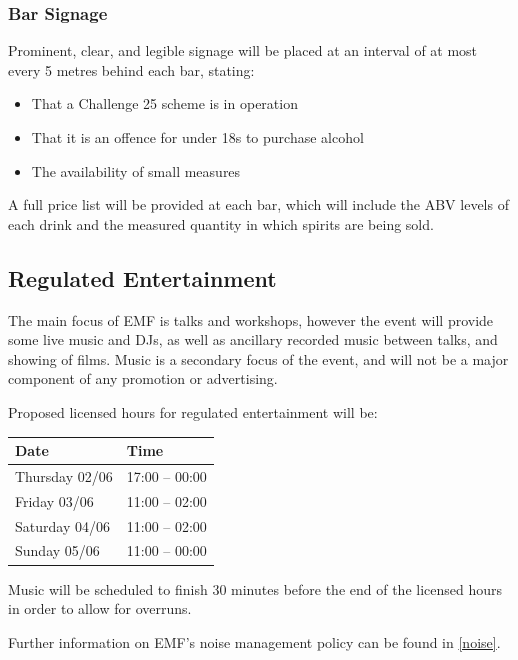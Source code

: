 \subsubsection{Bar Signage}

Prominent, clear, and legible signage will be placed at an interval of at most
every 5 metres behind each bar, stating:

\begin{itemize}
\tightlist
\item That a Challenge 25 scheme is in operation
\item That it is an offence for under 18s to purchase alcohol
\item The availability of small measures
\end{itemize}

A full price list will be provided at each bar, which will include the ABV levels
of each drink and the measured quantity in which spirits are being sold.

\subsection{Regulated Entertainment}

The main focus of EMF is talks and workshops, however the event will provide
some live music and DJs, as well as ancillary recorded music between talks, and
showing of films. Music is a secondary focus of the event, and will not be a major
component of any promotion or advertising.

Proposed licensed hours for regulated entertainment will be:

\begin{table}[h!]
    \centering
    \begin{tabular}{| l l |}
        \hline
        \textbf{Date} & \textbf{Time} \\
        \hline
        Thursday 02/06 & 17:00 -- 00:00 \\
        Friday 03/06 & 11:00 -- 02:00 \\
        Saturday 04/06 & 11:00 -- 02:00 \\
        Sunday 05/06 & 11:00 -- 00:00 \\
        \hline
    \end{tabular}
\end{table}

Music will be scheduled to finish 30 minutes before the end of the licensed hours in
order to allow for overruns.

Further information on EMF's noise management policy can be found in
\cref{noise}.

